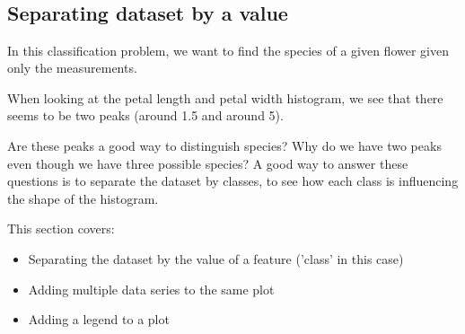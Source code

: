 \documentclass[8pt]{extarticle}
\providecommand{\tightlist}{%
      \setlength{\itemsep}{0pt}\setlength{\parskip}{0pt}}
\begin{document}
    \begin{center}
    \end{center}
    { \hspace*{\fill} \\}
    
    \begin{center}
    \end{center}
    { \hspace*{\fill} \\}
    
    \begin{center}
    \end{center}
    { \hspace*{\fill} \\}
    
    \begin{center}
    \end{center}
    { \hspace*{\fill} \\}
    
    \subsection{Separating dataset by a
value}\label{separating-dataset-by-a-value}

In this classification problem, we want to find the species of a given
flower given only the measurements.

When looking at the petal length and petal width histogram, we see that
there seems to be two peaks (around 1.5 and around 5).

Are these peaks a good way to distinguish species? Why do we have two
peaks even though we have three possible species? A good way to answer
these questions is to separate the dataset by classes, to see how each
class is influencing the shape of the histogram.

This section covers:

\begin{itemize}
\tightlist
\item
  Separating the dataset by the value of a feature ('class' in this
  case)
\item
  Adding multiple data series to the same plot
\item
  Adding a legend to a plot
\end{itemize}
\end{document}
